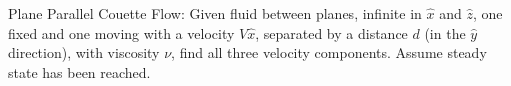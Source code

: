 
    Plane Parallel Couette Flow:  Given fluid between planes, infinite in
    $\hat{x}$ and $\hat{z}$, 
    one fixed and one moving with a velocity $V \hat{x}$, separated by a
    distance $d$ (in the $\hat{y}$ direction), with viscosity $\nu$,
    find all three velocity components.  Assume steady state has been reached.

